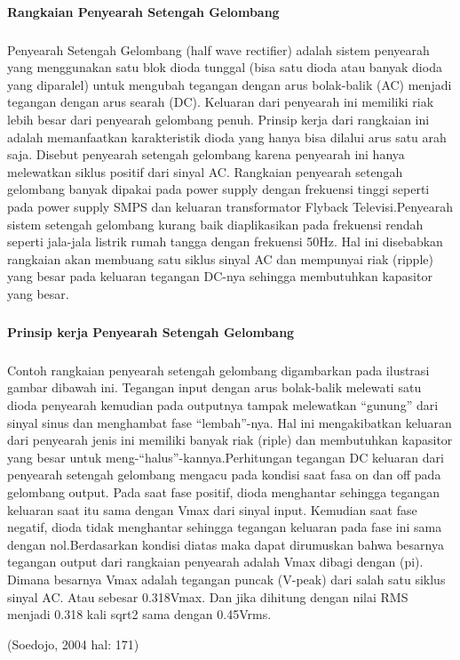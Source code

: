 \documentclass[12pt,a4paper]{article}
\begin{document}
\paragraph{ }
	\textbf{Rangkaian Penyearah Setengah Gelombang}
\subparagraph{ }
	Penyearah Setengah Gelombang (half wave rectifier) adalah sistem penyearah yang menggunakan satu blok dioda tunggal (bisa satu dioda atau banyak dioda yang diparalel) untuk mengubah tegangan dengan arus bolak-balik (AC) menjadi tegangan dengan arus searah (DC). Keluaran dari penyearah ini memiliki riak lebih besar dari penyearah gelombang penuh. Prinsip kerja dari rangkaian ini adalah  memanfaatkan karakteristik dioda yang hanya bisa dilalui arus satu arah saja. Disebut penyearah setengah gelombang karena penyearah ini hanya melewatkan siklus positif dari sinyal AC. Rangkaian penyearah setengah gelombang banyak dipakai pada power supply dengan frekuensi tinggi seperti pada power supply SMPS dan keluaran transformator Flyback Televisi.Penyearah sistem setengah gelombang kurang baik diaplikasikan pada frekuensi rendah seperti jala-jala listrik rumah tangga dengan frekuensi 50Hz. Hal ini disebabkan rangkaian akan membuang satu siklus sinyal AC dan mempunyai riak (ripple) yang besar pada keluaran tegangan DC-nya sehingga membutuhkan kapasitor yang besar.
\subparagraph{ }
	\textbf{Prinsip kerja Penyearah Setengah Gelombang}
\subparagraph{ }
	Contoh rangkaian penyearah setengah gelombang digambarkan pada ilustrasi gambar dibawah ini. Tegangan input dengan arus bolak-balik melewati satu dioda penyearah kemudian pada outputnya tampak melewatkan “gunung” dari sinyal sinus dan menghambat fase “lembah”-nya. Hal ini mengakibatkan keluaran dari penyearah jenis ini memiliki banyak riak (riple) dan membutuhkan kapasitor yang besar untuk meng-“halus”-kannya.Perhitungan tegangan DC keluaran dari penyearah setengah gelombang mengacu pada kondisi saat fasa on dan off pada gelombang output. Pada saat fase positif, dioda menghantar sehingga tegangan keluaran saat itu sama dengan Vmax dari sinyal input. Kemudian saat fase negatif, dioda tidak menghantar sehingga tegangan keluaran pada fase ini sama dengan nol.Berdasarkan kondisi diatas maka dapat dirumuskan bahwa besarnya tegangan output dari rangkaian penyearah adalah Vmax dibagi dengan (pi). Dimana besarnya Vmax adalah tegangan puncak (V-peak) dari salah satu siklus sinyal AC. Atau sebesar 0.318Vmax. Dan jika dihitung dengan nilai RMS menjadi 0.318 kali sqrt2 sama dengan 0.45Vrms.

\begin{flushright}
	(Soedojo, 2004 hal: 171) 
\end{flushright}
\end{document}
